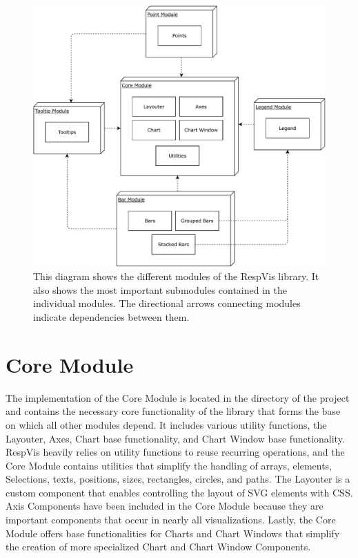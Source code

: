\begin{figure}[tp]
\centering
\includegraphics[keepaspectratio,width=\linewidth,height=\fullh]{diagrams/respvis-modules.pdf}
\caption[Modules of RespVis]{
  This diagram shows the different modules of the RespVis library.
  It also shows the most important submodules contained in the individual modules.
  The directional arrows connecting modules indicate dependencies between them.
}
\label{fig:Modules}
\end{figure}


\section{Core Module}

The implementation of the Core Module is located in the  directory of the project and contains the necessary core functionality of the library that forms the base on which all other modules depend.
It includes various utility functions, the Layouter, Axes, Chart base functionality, and Chart Window base functionality.
RespVis heavily relies on utility functions to reuse recurring operations, and the Core Module contains utilities that simplify the handling of arrays, elements, Selections, texts, positions, sizes, rectangles, circles, and paths.
The Layouter is a custom component that enables controlling the layout of SVG elements with CSS.
Axis Components have been included in the Core Module because they are important components that occur in nearly all visualizations.
Lastly, the Core Module offers base functionalities for Charts and Chart Windows that simplify the creation of more specialized Chart and Chart Window Components.

